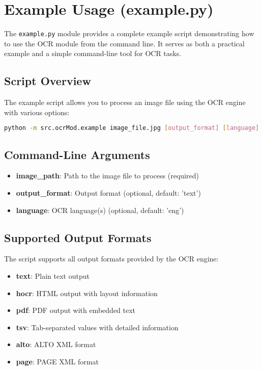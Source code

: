 \section{Example Usage (example.py)}

The \texttt{example.py} module provides a complete example script demonstrating how to use the OCR module from the command line. It serves as both a practical example and a simple command-line tool for OCR tasks.

\subsection{Script Overview}

The example script allows you to process an image file using the OCR engine with various options:

\begin{lstlisting}[language=bash]
python -m src.ocrMod.example image_file.jpg [output_format] [language]
\end{lstlisting}

\subsection{Command-Line Arguments}

\begin{itemize}
  \item \textbf{image\_path}: Path to the image file to process (required)
  \item \textbf{output\_format}: Output format (optional, default: 'text')
  \item \textbf{language}: OCR language(s) (optional, default: 'eng')
\end{itemize}

\subsection{Supported Output Formats}

The script supports all output formats provided by the OCR engine:
\begin{itemize}
  \item \textbf{text}: Plain text output
  \item \textbf{hocr}: HTML output with layout information
  \item \textbf{pdf}: PDF output with embedded text
  \item \textbf{tsv}: Tab-separated values with detailed information
  \item \textbf{alto}: ALTO XML format
  \item \textbf{page}: PAGE XML format
\end{itemize}

